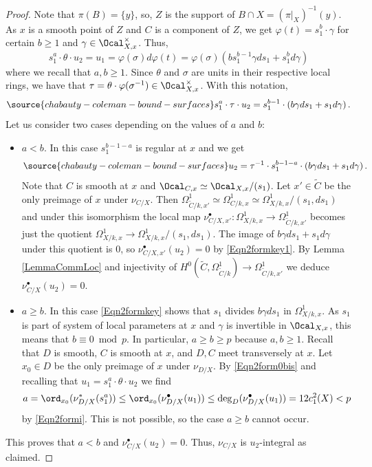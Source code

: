 \begin{proof}
Note that $\pi(B)=\{y\}$, so,  $Z$ is the support of $B\cap X=(\pi|_X)^{-1}(y)$. As $x$ is a smooth point of $Z$ and $C$ is a component of $Z$, we get $\varphi(t)=s_1^b\cdot \gamma$ for certain $b\ge 1$ and $\gamma\in \Ocal_{X,x}^\times$. Thus,
$$
s_1^a\cdot \theta\cdot u_2 = u_1 = \varphi(\sigma)d\varphi(t)= \varphi(\sigma)\left( bs_1^{b-1}\gamma d s_1+ s_1^{b}d\gamma \right)
$$
where we recall that $a,b\ge 1$. Since $\theta$ and $\sigma$ are units in their respective local rings, we have that $\tau=\theta\cdot \varphi(\sigma^{-1})\in \Ocal_{X,x}^\times$. With this notation,
\begin{equation}\label{Eqn2formkey}
\source{chabauty-coleman-bound-surfaces}
s_1^a \cdot \tau\cdot u_2 = s_1^{b-1}\cdot \left( b\gamma ds_1 + s_1 d\gamma \right).
\end{equation}
Let us consider two cases depending on the values of $a$ and $b$:
\begin{itemize}
\item $a<b$. In this case $s_1^{b-1-a}$ is regular at $x$ and we get
\begin{equation}\label{Eqn2formkey1}
\source{chabauty-coleman-bound-surfaces}
 u_2 = \tau^{-1}\cdot s_1^{b-1-a}\cdot \left( b\gamma ds_1 + s_1 d\gamma \right).
\end{equation}
Note that $C$ is smooth at $x$ and $\Ocal_{C,x}\simeq \Ocal_{X,x}/(s_1)$. Let $x'\in \widetilde{C}$ be the only preimage of $x$ under $\nu_{C/X}$.  Then $\Omega^1_{\widetilde{C}/k,x'}\simeq \Omega^1_{C/k,x}  \simeq \Omega^1_{X/k,x}/(s_1, ds_1)$ and under this isomorphism the local map $\nu_{C/X,x'}^\bullet:\Omega^1_{X/k,x}\to \Omega^1_{\widetilde{C}/k,x'}$ becomes just the quotient $\Omega^1_{X/k,x}\to \Omega^1_{X/k,x}/(s_1, ds_1)$. The image of $b\gamma ds_1 + s_1 d\gamma$ under this quotient is $0$, so $\nu_{C/X,x'}^\bullet(u_2)=0$ by \eqref{Eqn2formkey1}. By Lemma \ref{LemmaCommLoc} and injectivity of $H^0(\widetilde{C},\Omega^1_{\widetilde{C}/k})\to  \Omega^1_{\widetilde{C}/k,x'}$ we deduce $\nu^\bullet_{C/X}(u_2)=0$.


\item $a\ge b$. In this case \eqref{Eqn2formkey} shows that $s_1$ divides $b\gamma ds_1$ in $\Omega^1_{X/k,x}$. As $s_1$ is part of system of local parameters at $x$ and $\gamma$ is invertible in $\Ocal_{X,x}$, this means that $b\equiv 0\bmod p$. In particular, $a\ge b\ge p$ because $a,b\ge 1$. Recall that $D$ is smooth, $C$ is smooth at $x$, and $D,C$ meet transversely at $x$. Let $x_0\in D$ be the only preimage of $x$ under $\nu_{D/X}$. By \eqref{Eqn2form0bis} and recalling that $u_1=s_1^a\cdot \theta\cdot u_2$ we find
$$
a = \ord_{x_0}(\nu_{D/X}^*(s_1^a))\le \ord_{x_0}(\nu_{D/X}^\bullet (u_1))\le \deg_D(\nu_{D/X}^\bullet (u_1))= 12c_1^2(X)<p
$$
by \eqref{Eqn2formi}. This is not possible, so the case $a\ge b$ cannot occur.
\end{itemize}
This proves that $a<b$ and $\nu^\bullet_{C/X}(u_2)=0$. Thus, $\nu_{C/X}$ is $u_2$-integral as claimed.


\end{proof}
